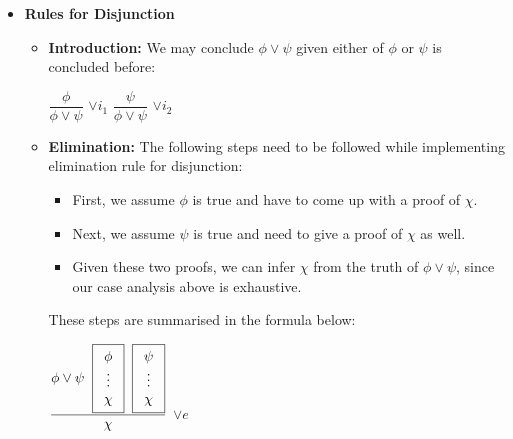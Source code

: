 \documentclass{report}
\begin{document}
\begin{itemize}
        \item{\textbf{Rules for Disjunction}}
         \begin{itemize}
             \item \textbf{Introduction:} We may conclude $\phi \vee \psi$ given either of $\phi$ or $\psi$ is concluded before:
             \begin{center}
                    $\dfrac{\phi}{\phi  \vee \psi}$   $\vee i_1$ \hspace{2cm}
                    $\dfrac{\psi}{\phi \vee \psi}$   $\vee i_2$
                \end{center}
             \item \textbf{Elimination:}  The following steps need to be followed while implementing elimination rule for disjunction:
             \begin{itemize}
                 \item First, we assume $\phi$ is true and have to come up with a proof of $\chi$.
                 \item Next, we assume $\psi$ is true and need to give a proof of $\chi$ as well. 
                 \item Given these two proofs, we can infer $\chi$ from the truth of $\phi \vee \psi$, since our case analysis above is exhaustive. \\
             \end{itemize}
             These steps are summarised in the formula below: \\
             \begin{center}
                 $\dfrac{\phi \vee \psi \hspace{0.2cm} \boxed{
        \begin{array}{c}
          \phi\\
          \vdots\\
          \chi
        \end{array}
      } \hspace{0.2cm} \boxed {
      \begin{array}{c}
          \psi\\
          \vdots\\
          \chi
        \end{array}
      }}{\chi}$ $\vee e$
             \end{center}
         \end{itemize}
        

\end{itemize}
\end{document}
